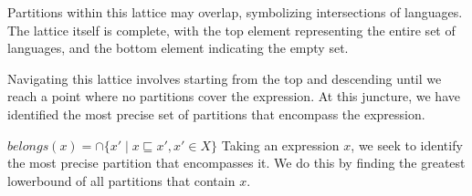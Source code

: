 Partitions within this lattice may overlap, symbolizing intersections of languages. The lattice itself is complete, with the top element representing the entire set of languages, and the bottom element indicating the empty set.

Navigating this lattice involves starting from the top and descending until we reach a point where no partitions cover the expression. At this juncture, we have identified the most precise set of partitions that encompass the expression.

$ belongs(x)=\cap\{x' \mid x \sqsubseteq x', x' \in X\} $
Taking an expression $x$, we seek to identify the most precise partition that encompasses it. We do this by finding the greatest lowerbound of all partitions that contain $x$.

